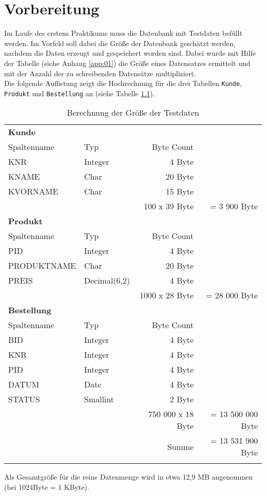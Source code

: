\chapter{Vorbereitung}
Im Laufe des erstens Praktikums muss die Datenbank mit Testdaten befüllt werden. Im Vorfeld soll dabei die Größe der Datenbank geschätzt werden, nachdem die Daten erzeugt und gespeichert worden sind. 
Dabei wurde mit Hilfe der Tabelle (siehe Anhang \ref{app:01}) die Größe eines Datensatzes ermittelt und mit der Anzahl der zu schreibenden Datensätze multipliziert.\\

Die folgende Auflistung zeigt die Hochrechnung für die drei Tabellen \texttt{Kunde}, \texttt{Produkt} und \texttt{Bestellung} an (siehe Tabelle \ref{tbl:size_of_data}).
\begin{longtable}{|l|l|r|r|} \hline
\multicolumn{4}{|l|}{ \textbf{Kunde}}\\
Spaltenname & Typ & Byte Count & \\
\hline 
KNR & Integer & 4 Byte & \\
KNAME & Char & 20 Byte & \\ 
KVORNAME & Char & 15 Byte &\\ \hline
\multicolumn{2}{|r}{} & 100 x 39 Byte & = 3 900 Byte \\ \hline

\multicolumn{4}{|l|}{ \textbf{Produkt}}\\
Spaltenname & Typ & Byte Count &\\
\hline 
PID & Integer & 4 Byte & \\
PRODUKTNAME & Char & 20 Byte & \\ 
PREIS & Decimal(6,2) & 4 Byte & \\ \hline
\multicolumn{2}{|r}{} & 1000 x 28 Byte & = 28 000 Byte \\ \hline

\multicolumn{4}{|l|}{ \textbf{Bestellung}}\\
Spaltenname & Typ & Byte Count &\\ \hline 
BID & Integer & 4 Byte & \\
KNR & Integer & 4 Byte & \\ 
PID & Integer & 4 Byte & \\ 
DATUM & Date & 4 Byte & \\ 
STATUS & Smallint & 2 Byte & \\ \hline
\multicolumn{2}{|r}{} & 750 000 x 18 Byte & = 13 500 000 Byte \\ \hline
\multicolumn{3}{|r}{Summe} & = 13 531 900 Byte \\ \hline
\caption{Berechnung der Größe der Testdaten}
\label{tbl:size_of_data}
\end{longtable}
Als Gesamtgröße für die reine Datenmenge wird in etwa 12,9 MB angenommen (bei 1024Byte = 1 KByte). 

